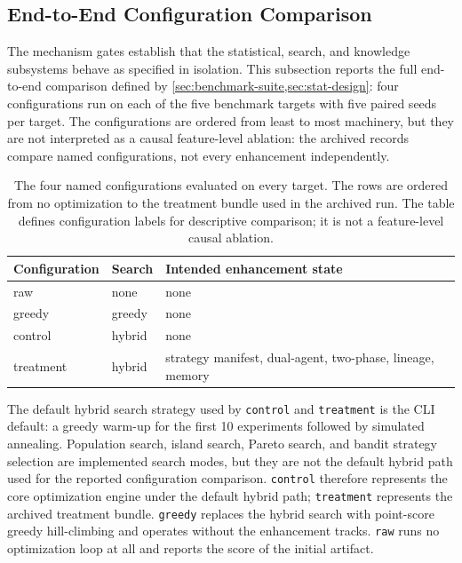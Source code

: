 \subsection{End-to-End Configuration Comparison}
\label{sec:end-to-end}

The mechanism gates establish that the statistical, search, and knowledge subsystems behave as specified in isolation.
This subsection reports the full end-to-end comparison defined by \cref{sec:benchmark-suite,sec:stat-design}: four configurations run on each of the five benchmark targets with five paired seeds per target.
The configurations are ordered from least to most machinery, but they are not interpreted as a causal feature-level ablation: the archived records compare named configurations, not every enhancement independently.

\begin{table}[t]
  \centering
  \caption{The four named configurations evaluated on every target. The rows are ordered from no optimization to the treatment bundle used in the archived run. The table defines configuration labels for descriptive comparison; it is not a feature-level causal ablation.}
  \label{tab:e2e-configs}
  \footnotesize
  \begin{tabular}{@{}llp{3.8cm}@{}}
    \toprule
    Configuration & Search & Intended enhancement state \\
    \midrule
    raw       & none   & none \\
    greedy    & greedy & none \\
    control   & hybrid & none \\
    treatment & hybrid & strategy manifest, dual-agent, two-phase, lineage, memory \\
    \bottomrule
  \end{tabular}
\end{table}

The default hybrid search strategy used by \texttt{control} and \texttt{treatment} is the CLI default: a greedy warm-up for the first 10 experiments followed by simulated annealing.
Population search, island search, Pareto search, and bandit strategy selection are implemented search modes, but they are not the default hybrid path used for the reported configuration comparison.
\texttt{control} therefore represents the core optimization engine under the default hybrid path; \texttt{treatment} represents the archived treatment bundle.
\texttt{greedy} replaces the hybrid search with point-score greedy hill-climbing and operates without the enhancement tracks.
\texttt{raw} runs no optimization loop at all and reports the score of the initial artifact.

